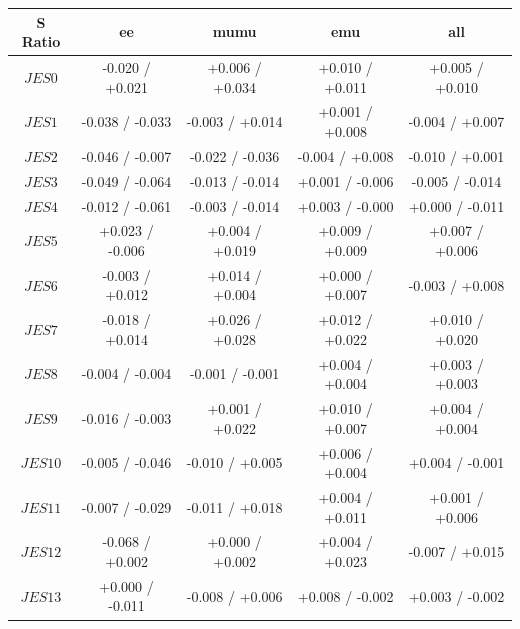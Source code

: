  \begin{table}[htbp]
\footnotesize
   \begin{center}
   \begin{tabular}{|c|c|c|c|c|}
   \hline
     \textbf{S Ratio}           &  ee &mumu &emu&all\\
   \hline
   $JES 0$                             &  -0.020   / +0.021   & +0.006   / +0.034   & +0.010   / +0.011   & +0.005   / +0.010   \\
   $JES 1$                             &  -0.038   / -0.033   & -0.003   / +0.014   & +0.001   / +0.008   & -0.004   / +0.007   \\
   $JES 2$                             &  -0.046   / -0.007   & -0.022   / -0.036   & -0.004   / +0.008   & -0.010   / +0.001   \\
   $JES 3$                             &  -0.049   / -0.064   & -0.013   / -0.014   & +0.001   / -0.006   & -0.005   / -0.014   \\
   $JES 4$                             &  -0.012   / -0.061   & -0.003   / -0.014   & +0.003   / -0.000   & +0.000   / -0.011   \\
   $JES 5$                             &  +0.023   / -0.006   & +0.004   / +0.019   & +0.009   / +0.009   & +0.007   / +0.006   \\
   $JES 6$                             &  -0.003   / +0.012   & +0.014   / +0.004   & +0.000   / +0.007   & -0.003   / +0.008   \\
   $JES 7$                             &  -0.018   / +0.014   & +0.026   / +0.028   & +0.012   / +0.022   & +0.010   / +0.020   \\
   $JES 8$                             &  -0.004   / -0.004   & -0.001   / -0.001   & +0.004   / +0.004   & +0.003   / +0.003   \\
   $JES 9$                             &  -0.016   / -0.003   & +0.001   / +0.022   & +0.010   / +0.007   & +0.004   / +0.004   \\
   $JES {10}$                          &  -0.005   / -0.046   & -0.010   / +0.005   & +0.006   / +0.004   & +0.004   / -0.001   \\
   $JES {11}$                          &  -0.007   / -0.029   & -0.011   / +0.018   & +0.004   / +0.011   & +0.001   / +0.006   \\
   $JES {12}$                          &  -0.068   / +0.002   & +0.000   / +0.002   & +0.004   / +0.023   & -0.007   / +0.015   \\
   $JES {13}$                          &  +0.000   / -0.011   & -0.008   / +0.006   & +0.008   / -0.002   & +0.003   / -0.002   \\

\end{tabular}
\end{center}
\end{table}
